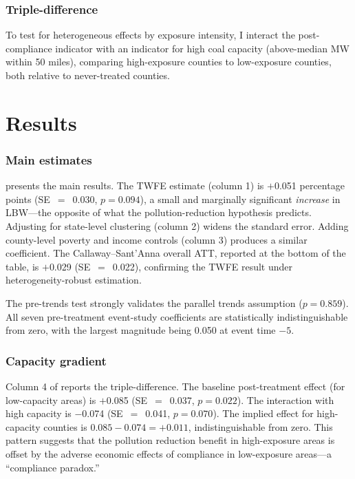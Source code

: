 \documentclass[12pt]{article}
\begin{document}
\subsubsection*{Triple-difference} To test for heterogeneous effects by exposure intensity, I interact the post-compliance indicator with an indicator for high coal capacity (above-median MW within 50 miles), comparing high-exposure counties to low-exposure counties, both relative to never-treated counties.


\section{Results}

\subsubsection*{Main estimates}  presents the main results. The TWFE estimate (column 1) is $+$0.051 percentage points (SE~$=$~0.030, $p = 0.094$), a small and marginally significant \textit{increase} in LBW---the opposite of what the pollution-reduction hypothesis predicts. Adjusting for state-level clustering (column 2) widens the standard error. Adding county-level poverty and income controls (column 3) produces a similar coefficient. The Callaway--Sant'Anna overall ATT, reported at the bottom of the table, is $+$0.029 (SE~$=$~0.022), confirming the TWFE result under heterogeneity-robust estimation.

The pre-trends test strongly validates the parallel trends assumption ($p = 0.859$). All seven pre-treatment event-study coefficients are statistically indistinguishable from zero, with the largest magnitude being 0.050 at event time $-5$.

\subsubsection*{Capacity gradient} Column 4 of  reports the triple-difference. The baseline post-treatment effect (for low-capacity areas) is $+$0.085 (SE~$=$~0.037, $p = 0.022$). The interaction with high capacity is $-$0.074 (SE~$=$~0.041, $p = 0.070$). The implied effect for high-capacity counties is $0.085 - 0.074 = +0.011$, indistinguishable from zero. This pattern suggests that the pollution reduction benefit in high-exposure areas is offset by the adverse economic effects of compliance in low-exposure areas---a ``compliance paradox.''
\end{document}

